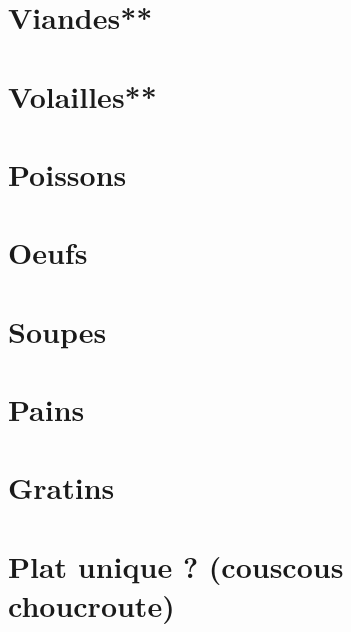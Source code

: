 \documentclass[A4paper,twoside, 12pt]{book}
\begin{document}
	\chapter{Viandes**}









	\chapter{Volailles**}






	
	\chapter{Poissons}

	
	\chapter{Oeufs}
	\chapter{Soupes}








	\chapter{Pains}

	\chapter{Gratins}
	\chapter{Plat unique ? (couscous choucroute)}



		
\end{document}
